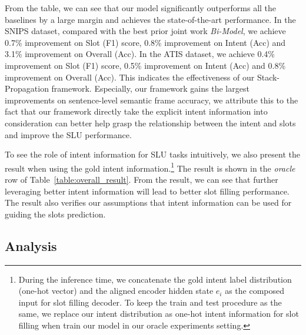 \documentclass[11pt,a4paper]{article}
\begin{document}
From the table, we can see that our model
significantly outperforms all the baselines by a 
large margin and achieves the state-of-the-art 
performance.  In the SNIPS dataset, compared 
with the best prior joint work \textit{Bi-Model},
we achieve 0.7\% improvement on Slot (F1) score, 
0.8\% improvement on Intent (Acc) and 3.1\% 
improvement on Overall (Acc). In the ATIS dataset, we 
achieve 0.4\% improvement on Slot (F1) score, 
0.5\% improvement on Intent (Acc) and 0.8\%  
improvement on Overall (Acc).
This indicates the effectiveness of our 
Stack-Propagation framework. Especially, our framework gains the 
largest improvements on sentence-level semantic frame accuracy, we attribute this to the fact 
that our framework directly take the explicit intent information into 
consideration can better help grasp the relationship between the intent and slots and improve the SLU performance.

To see the role of intent information for SLU tasks intuitively, we also present the result when using the gold intent 
information.\footnote{During the inference time, we concatenate the gold intent 
	label distribution (one-hot vector) and the aligned encoder hidden state  $e_{i}$ as the 
	composed input for slot filling decoder. To keep the train and test procedure as the same, we replace our intent distribution as one-hot intent information for slot filling when train our model in our oracle experiments setting.} The result is 
shown in the \textit{oracle} row of Table~\ref{table:overall_result}. 
From the result, we can see that further leveraging better intent
information will lead to better slot filling performance. The result also verifies our assumptions that intent information can be used for guiding the slots prediction.


\subsection{Analysis}
\end{document}
